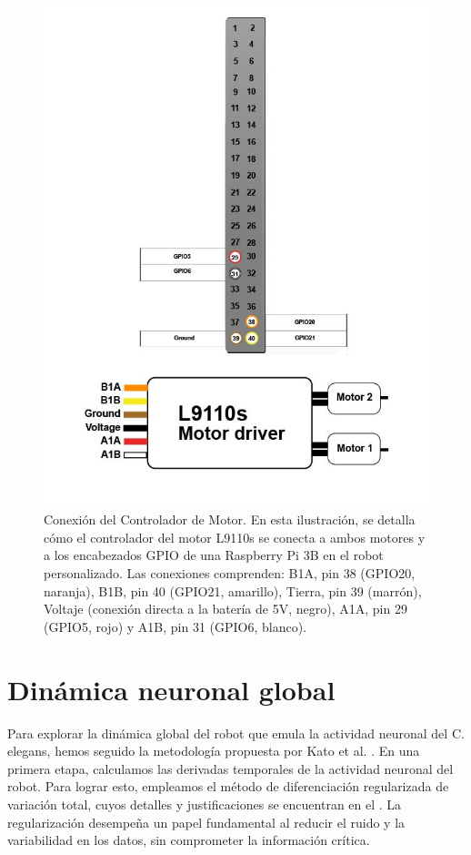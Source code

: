 \begin{figure}[h!]
	\centering\includegraphics[width=\imsize]{sensor_distancia2.png}
	\caption[Conexión del Controlador de Motor.]{ Conexión del Controlador de Motor. En esta ilustración, se detalla cómo el controlador del motor L9110s se conecta a ambos motores y a los encabezados GPIO de una Raspberry Pi 3B en el robot personalizado. Las conexiones comprenden: B1A, pin 38 (GPIO20, naranja), B1B, pin 40 (GPIO21, amarillo), Tierra, pin 39 (marrón), Voltaje (conexión directa a la batería de 5V, negro), A1A, pin 29 (GPIO5, rojo) y A1B, pin 31 (GPIO6, blanco).}\label{fig:sensor_distancia2}
\end{figure}


\section{Dinámica neuronal global}\label{sec:dinamicakato}

Para explorar la dinámica global del robot que emula la actividad neuronal del C. elegans, hemos seguido la metodología propuesta por Kato et al. \cite{kato_global_2015}. En una primera etapa, calculamos las derivadas temporales de la actividad neuronal del robot. Para lograr esto, empleamos el método de diferenciación regularizada de variación total, cuyos detalles y justificaciones se encuentran en el . La regularización desempeña un papel fundamental al reducir el ruido y la variabilidad en los datos, sin comprometer la información crítica.


